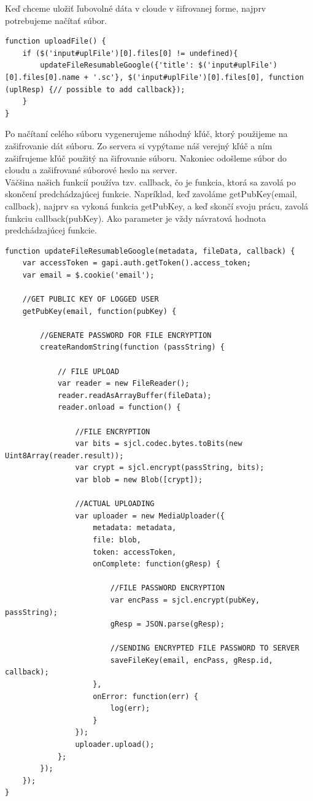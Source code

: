 		Keď chceme uložiť ľubovolné dáta v cloude v šifrovanej forme, najprv potrebujeme načítať súbor.
\medskip
\begin{lstlisting}[caption=Načítanie súboru]		
function uploadFile() {
    if ($('input#uplFile')[0].files[0] != undefined){
        updateFileResumableGoogle({'title': $('input#uplFile')[0].files[0].name + '.sc'}, $('input#uplFile')[0].files[0], function (uplResp) {// possible to add callback});
    }
}
\end{lstlisting}		

		Po načítaní celého súboru vygenerujeme náhodný kľúč, ktorý použijeme na zašifrovanie dát súboru. Zo servera si vypýtame náš verejný kľúč a ním zašifrujeme kľúč použitý na šifrovanie súboru. Nakoniec odošleme súbor do cloudu a zašifrované súborové heslo na server. \\
		Väčšina našich funkcií používa tzv. callback, čo je funkcia, ktorá sa zavolá po skončení predchádzajúcej funkcie. Napríklad, keď zavoláme getPubKey(email, callback), najprv sa vykoná funkcia getPubKey, a keď skončí svoju prácu, zavolá funkciu callback(pubKey). Ako parameter je vždy návratová hodnota predchádzajúcej funkcie.
		
		
\medskip
\begin{lstlisting}[caption=Upload súboru, firstnumber=6]		
function updateFileResumableGoogle(metadata, fileData, callback) {
    var accessToken = gapi.auth.getToken().access_token;
    var email = $.cookie('email');

    //GET PUBLIC KEY OF LOGGED USER
    getPubKey(email, function(pubKey) {

        //GENERATE PASSWORD FOR FILE ENCRYPTION
        createRandomString(function (passString) {

            // FILE UPLOAD
            var reader = new FileReader();
            reader.readAsArrayBuffer(fileData);
            reader.onload = function() {
            
                //FILE ENCRYPTION
                var bits = sjcl.codec.bytes.toBits(new Uint8Array(reader.result));
                var crypt = sjcl.encrypt(passString, bits);
                var blob = new Blob([crypt]);

                //ACTUAL UPLOADING
                var uploader = new MediaUploader({
                    metadata: metadata,
                    file: blob,
                    token: accessToken,
                    onComplete: function(gResp) {

                        //FILE PASSWORD ENCRYPTION
                        var encPass = sjcl.encrypt(pubKey, passString);
                        gResp = JSON.parse(gResp);

                        //SENDING ENCRYPTED FILE PASSWORD TO SERVER
                        saveFileKey(email, encPass, gResp.id, callback);
                    },
                    onError: function(err) {
                        log(err);
                    }
                });
                uploader.upload();
            };
        });
    });
}
\end{lstlisting}		
	

